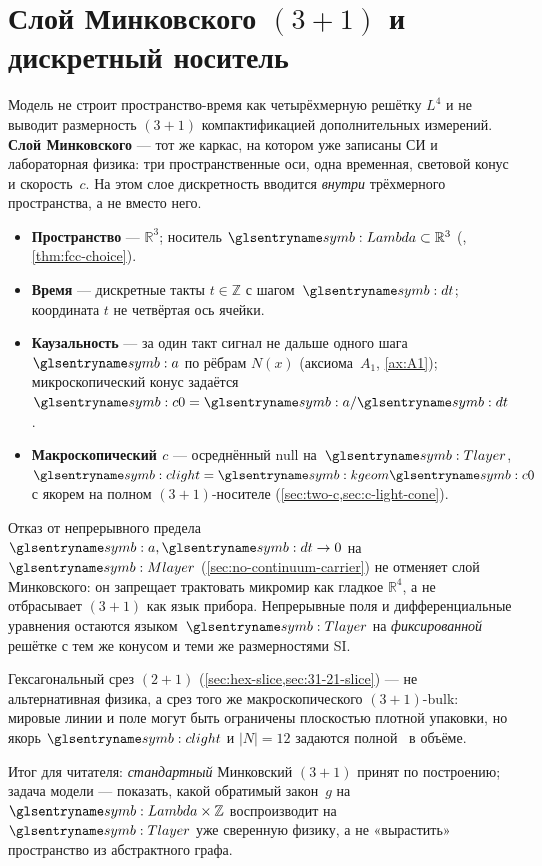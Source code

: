 \section{Слой Минковского $(3{+}1)$ и дискретный носитель}
\label{sec:minkowski-layer}

Модель не строит пространство-время как четырёхмерную решётку $L^4$
и не выводит размерность $(3{+}1)$ компактификацией дополнительных измерений.
\textbf{Слой Минковского} --- тот же каркас, на котором уже записаны СИ и лабораторная физика:
три пространственные оси, одна временная, световой конус и скорость~$c$.
На этом слое дискретность вводится \emph{внутри} трёхмерного пространства, а не вместо него.

\begin{definition}
\label{def:minkowski-carrier-split}
\begin{itemize}
  \item \textbf{Пространство} --- $\mathbb{R}^3$; носитель $\carrierLattice\subset\mathbb{R}^3$
  (\latGCK, \cref{thm:fcc-choice}).
  \item \textbf{Время} --- дискретные такты $t\in\mathbb{Z}$ с шагом~$\htick$; координата $t$ не четвёртая ось ячейки.
  \item \textbf{Каузальность} --- за один такт сигнал не дальше одного шага~$\caStepSpace$ по рёбрам $N(x)$
  (аксиома~$A_1$, \cref{ax:A1}); микроскопический конус задаётся $\caSignalSpeed=\caStepSpace/\htick$.
  \item \textbf{Макроскопический $c$} --- осреднённый null на~$\layerMacro$,
  $\speedC=\caKappaGeom \caSignalSpeed$ с якорем на полном $(3{+}1)$-носителе (\cref{sec:two-c,sec:c-light-cone}).
\end{itemize}
\end{definition}

Отказ от непрерывного предела $\caStepSpace,\htick\to 0$ на~$\layerMicro$
(\cref{sec:no-continuum-carrier}) не отменяет слой Минковского:
он запрещает трактовать микромир как гладкое $\mathbb{R}^4$, а не отбрасывает $(3{+}1)$ как язык прибора.
Непрерывные поля и дифференциальные уравнения остаются языком~$\layerMacro$ на \emph{фиксированной} решётке
с тем же конусом и теми же размерностями SI.

Гексагональный срез $(2{+}1)$ (\cref{sec:hex-slice,sec:31-21-slice})
--- не альтернативная физика, а срез того же макроскопического $(3{+}1)$-bulk:
мировые линии и поле могут быть ограничены плоскостью плотной упаковки,
но якорь $\speedC$ и $|N|=12$ задаются полной \latGCKshort\ в объёме.

\medskip
\noindent
Итог для читателя: \emph{стандартный} Минковский $(3{+}1)$ принят по построению;
задача модели --- показать, какой обратимый закон~$g$ на $\carrierLattice\times\mathbb{Z}$
воспроизводит на~$\layerMacro$ уже сверенную физику, а не «вырастить» пространство из абстрактного графа.
